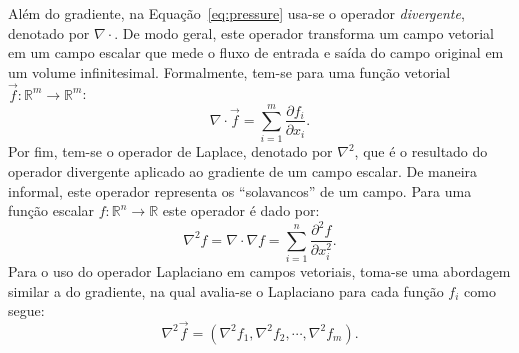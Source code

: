 \documentclass[12pt,a4paper,dvipsnames]{article}
\newcommand{\eqnref}[1]{Equação~\eqref{#1}}
\begin{document}
Além do gradiente, na \eqnref{eq:pressure} usa-se o operador \textit{divergente}, denotado por $\nabla \cdot$. De modo geral, este operador transforma um campo vetorial em um campo escalar que  mede o fluxo de entrada e saída do campo original em um volume infinitesimal. Formalmente, tem-se para uma função vetorial $\Vec{f}: \mathbb{R}^m \to \mathbb{R}^m$:
%
\begin{equation}
    \nabla \cdot \Vec{f} = \sum_{i = 1}^{m} \frac{\partial f_i}{\partial x_i}.
\end{equation}
Por fim, tem-se o operador de Laplace, denotado por $\nabla^2$, que é o resultado do operador divergente aplicado ao gradiente de um campo escalar. De maneira informal, este operador representa os ``solavancos'' de um campo. Para uma função escalar $f: \mathbb{R}^n \to \mathbb{R}$ este operador é dado por:
\begin{equation}
    \nabla^2 f = \nabla \cdot \nabla f = \sum_{i = 1}^{n} \frac{\partial^2 f}{\partial x_i^2}.
\end{equation}
Para o uso do operador Laplaciano em campos vetoriais, toma-se uma abordagem similar a do gradiente, na qual avalia-se o Laplaciano para cada função $f_i$ como segue:
%
\begin{equation}
    \nabla^2 \Vec{f} = (\nabla^2 f_1, \nabla^2 f_2, \cdots, \nabla^2 f_m).
\end{equation}
\end{document}
